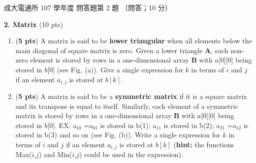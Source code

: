 \begin{pastexam}[label={px:ncku-107-cce-06}]{成大電通所 107 學年度 問答題第 2 題}
（問答；10 分）

\textbf{2. Matrix} (10 pts)
\begin{enumerate}[label=\alph*.]
\item (\textbf{5 pts}) A matrix is said to be \textbf{lower triangular} when all elements below the main diagonal of square matrix is zero. Given a lower triangle \textbf{A}, each non-zero element is stored by rows in a one-dimensional array \textbf{B} with $a$[0][0] being stored in $b$[0] (see Fig. (a)). Give a single expression for $k$ in terms of $i$ and $j$ if an element $a_{i,j}$ is stored at $b[k]$.
\item (\textbf{5 pts}) A matrix is said to be a \textbf{symmetric matrix} if it is a square matrix and its transpose is equal to itself. Similarly, each element of a symmetric matrix is stored by rows in a one-dimensional array \textbf{B} with $a$[0][0] being stored in $b$[0]. EX: a$_{10}$ =a$_{01}$ is stored in b(1); a$_{11}$ is stored in b(2); a$_{21}$ =a$_{12}$ is stored in b(3) and so on (see Fig. (b)). Write a single expression for $k$ in terms of $i$ and $j$ if an element $a_{i,j}$ is stored at $b[k]$ (\textbf{hint:} the functions Max($i$,$j$) and Min($i$,$j$) could be used in the expression).
\end{enumerate}


\end{pastexam}
